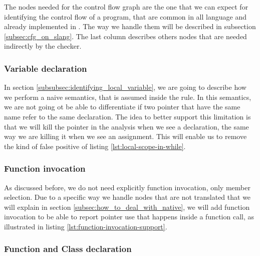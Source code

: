 The nodes needed for the control flow graph are the one that we can expect for identifying the control flow of a program, that are common in all language and already implemented in \slang. 
The way we handle them will be described in subsection \ref{subsec:cfg_on_slang}.
The last column describes others nodes that are needed indirectly by the checker.

\subsubsection{Variable declaration}
\label{subsubsec:variable_declaration}



In section \ref{subsubsec:identifying_local_variable}, we are going to describe how we perform a naive semantics, that is assumed inside the rule.
In this semantics, we are not going ot be able to differentiate if two pointer that have the same name refer to the same declaration. 
The idea to better support this limitation is that we will kill the pointer in the analysis when we see a declaration, the same way we are killing it when we see an assignment.
This will enable us to remove the kind of false positive of listing \ref{lst:local-scope-in-while}.

\subsubsection{Function invocation}
\label{subsubsec:function_invocation}



As discussed before, we do not need explicitly function invocation, only member selection. 
Due to a specific way we handle nodes that are not translated that we will explain in section \ref{subsec:how_to_deal_with_native}, we will add function invocation to be able to report pointer use that happens inside a function call, as illustrated in listing \ref{lst:function-invocation-support}.

\subsubsection{Function and Class declaration}
\label{subsubsec:function_class_declaration}

